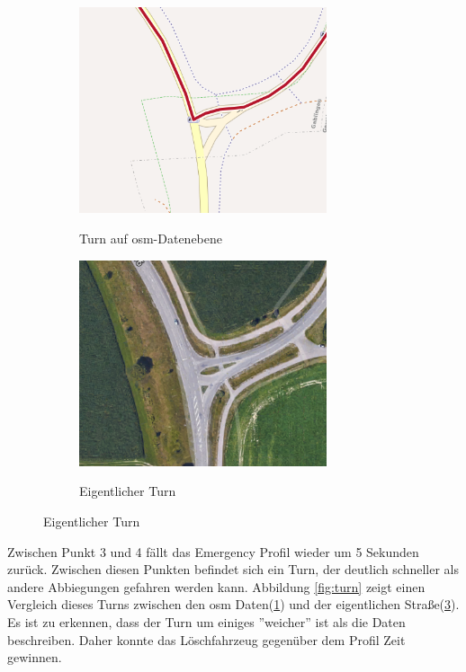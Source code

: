 \begin{figure}[h]
\centering
\caption{Fahrt 3 -- Vergleich eines Turns}
\label{fig:turn}
\begin{subfigure}{0.49\textwidth}
\centering
\includegraphics[width = 0.80\textwidth]{../media/Fahrt3_Turn.png} \\
\caption{Turn auf \gls{osm}-Datenebene}
\label{fig:turnosm}
\end{subfigure}
\begin{subfigure}{0.49\textwidth}
\centering
\includegraphics[width = 0.80\textwidth]{../media/Fahrt3_actualturn.png} \\
\caption{Eigentlicher Turn}
\label{fig:turnworld}
\end{subfigure}
\end{figure}

Zwischen Punkt 3 und 4 fällt das Emergency Profil wieder um 5 Sekunden zurück.
Zwischen diesen Punkten befindet sich ein Turn, der deutlich schneller als andere Abbiegungen gefahren werden kann.
Abbildung \ref{fig:turn} zeigt einen Vergleich dieses Turns zwischen den \gls{osm} Daten(\ref{fig:turnosm}) und der eigentlichen Straße(\ref{fig:turnworld}).
Es ist zu erkennen, dass der Turn um einiges ''weicher'' ist als die Daten beschreiben.
Daher konnte das Löschfahrzeug gegenüber dem Profil Zeit gewinnen.

